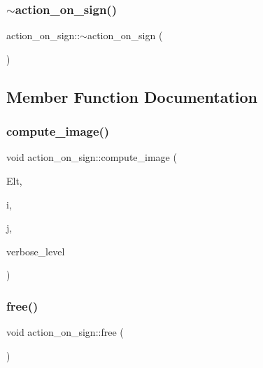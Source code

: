 \subsubsection{\texorpdfstring{$\sim$action\+\_\+on\+\_\+sign()}{~action\_on\_sign()}}
{\footnotesize\ttfamily action\+\_\+on\+\_\+sign\+::$\sim$action\+\_\+on\+\_\+sign (\begin{DoxyParamCaption}{ }\end{DoxyParamCaption})}



\subsection{Member Function Documentation}
\mbox{\label{classaction__on__sign_a50a03ddd12e5619d59aee3de0fb5930e}} 
\subsubsection{\texorpdfstring{compute\+\_\+image()}{compute\_image()}}
{\footnotesize\ttfamily void action\+\_\+on\+\_\+sign\+::compute\+\_\+image (\begin{DoxyParamCaption}\item[{\mbox{\hyperlink{galois_8h_a09fddde158a3a20bd2dcadb609de11dc}{I\+NT}} $\ast$}]{Elt,  }\item[{\mbox{\hyperlink{galois_8h_a09fddde158a3a20bd2dcadb609de11dc}{I\+NT}}}]{i,  }\item[{\mbox{\hyperlink{galois_8h_a09fddde158a3a20bd2dcadb609de11dc}{I\+NT}} \&}]{j,  }\item[{\mbox{\hyperlink{galois_8h_a09fddde158a3a20bd2dcadb609de11dc}{I\+NT}}}]{verbose\+\_\+level }\end{DoxyParamCaption})}

\mbox{\label{classaction__on__sign_a2158c217f42a01fe231276a5c5370ad2}} 
\subsubsection{\texorpdfstring{free()}{free()}}
{\footnotesize\ttfamily void action\+\_\+on\+\_\+sign\+::free (\begin{DoxyParamCaption}{ }\end{DoxyParamCaption})}

